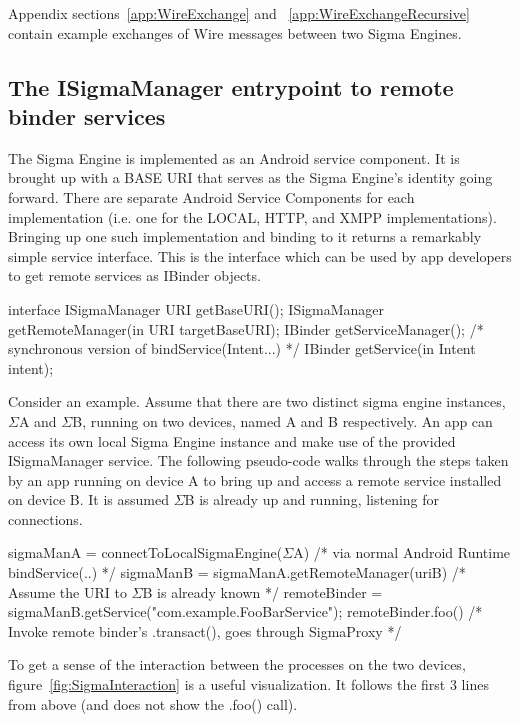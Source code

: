 \documentclass[prodmode]{acmlarge}
\begin{document}
Appendix sections~\ref{app:WireExchange} and ~\ref{app:WireExchangeRecursive} contain example exchanges of Wire messages between two Sigma Engines.

\subsection{The ISigmaManager entrypoint to remote binder services}
\label{sec:SigmaAsABinderService}
The Sigma Engine is implemented as an Android service component. It is brought up with a BASE URI that serves as the Sigma Engine's identity going forward. There are separate Android Service Components for each implementation (i.e. one for the LOCAL, HTTP, and XMPP implementations). Bringing up one such implementation and binding to it returns a remarkably simple service interface. This is the interface which can be used by app developers to get remote services as IBinder objects.

\begin{snippet}
interface ISigmaManager {
    URI getBaseURI();
    ISigmaManager getRemoteManager(in URI targetBaseURI);
    IBinder getServiceManager();
    /* synchronous version of bindService(Intent...) */
    IBinder getService(in Intent intent);
}
\end{snippet}

Consider an example. Assume that there are two distinct sigma engine instances, $\Sigma$A and $\Sigma$B, running on two devices, named A and B respectively. An app can access its own local Sigma Engine instance and make use of the provided ISigmaManager service. The following pseudo-code walks through the steps taken by an app running on device A to bring up and access a remote service installed on device B. It is assumed $\Sigma$B is already up and running, listening for connections.

\begin{snippet}
sigmaManA = connectToLocalSigmaEngine($\Sigma$A) /* via normal Android Runtime bindService(..) */
sigmaManB = sigmaManA.getRemoteManager(uriB) /*  Assume the URI to $\Sigma$B is already known */
remoteBinder = sigmaManB.getService("com.example.FooBarService");
remoteBinder.foo() /* Invoke remote binder's .transact(), goes through SigmaProxy */
\end{snippet}

To get a sense of the interaction between the processes on the two devices, figure~\ref{fig:SigmaInteraction} is a useful visualization. It follows the first 3 lines from above (and does not show the .foo() call).
\end{document}

